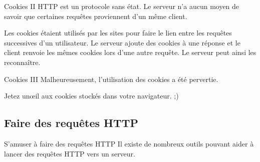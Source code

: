 \documentclass{beamer}
\begin{document}
\begin{frame}{Cookies II}
  HTTP est un protocole sans état. Le serveur n'a aucun moyen de savoir que certaines requêtes proviennent d'un même client.
  
  Les cookies étaient utilisés par les sites pour faire le lien entre les requêtes successives d'un utilisateur. Le serveur ajoute des cookies à une réponse et le client renvoie les mêmes cookies lors d'une autre requête. Le serveur peut ainsi les reconnaître.
\end{frame}

\begin{frame}{Cookies III}
Malheureusement, l'utilisation des cookies a été pervertie.

Jetez un\oe{}il aux cookies stockés dans votre navigateur. ;)
\end{frame}

\subsection{Faire des requêtes HTTP}
\begin{frame}{S'amuser à faire des requêtes HTTP}
Il existe de nombreux outils pouvant aider à lancer des requêtes HTTP vers un serveur.
\begin{itemize}
\end{itemize}
\end{frame}
\end{document}
